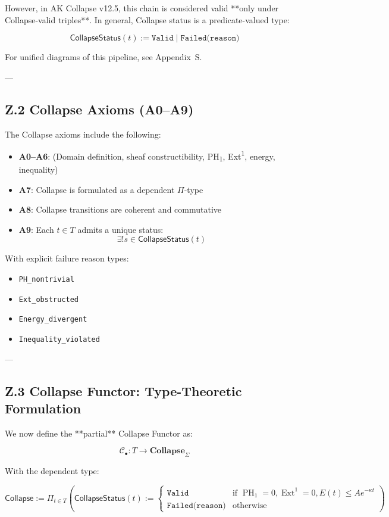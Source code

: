 \documentclass[11pt]{article}
\DeclareMathOperator{\Ext}{Ext}
\DeclareMathOperator{\PH}{PH}
\begin{document}
However, in AK Collapse v12.5, this chain is considered valid **only under Collapse-valid triples**.  
In general, Collapse status is a predicate-valued type:

\[
\mathsf{CollapseStatus}(t) := \texttt{Valid} \;|\; \texttt{Failed(reason)}
\]

For unified diagrams of this pipeline, see Appendix~S.

---

\subsection*{Z.2 Collapse Axioms (A0--A9)}

The Collapse axioms include the following:

\begin{itemize}
  \item \textbf{A0--A6}: (Domain definition, sheaf constructibility, PH\textsubscript{1}, Ext\textsuperscript{1}, energy, inequality)
  \item \textbf{A7}: Collapse is formulated as a dependent \( \Pi \)-type
  \item \textbf{A8}: Collapse transitions are coherent and commutative
  \item \textbf{A9}: Each \( t \in T \) admits a unique status:  
  \[
  \exists! s \in \mathsf{CollapseStatus}(t)
  \]
\end{itemize}

With explicit failure reason types:
\begin{itemize}
  \item[] \texttt{PH\_nontrivial}
  \item[] \texttt{Ext\_obstructed}
  \item[] \texttt{Energy\_divergent}
  \item[] \texttt{Inequality\_violated}
\end{itemize}

---

\subsection*{Z.3 Collapse Functor: Type-Theoretic Formulation}

We now define the **partial** Collapse Functor as:

\[
\mathcal{C}_\bullet : T \longrightarrow \mathbf{Collapse}_{\Sigma}
\]

With the dependent type:

\[
\mathsf{Collapse} := \Pi_{t \in T} \left(
  \mathsf{CollapseStatus}(t) := 
  \begin{cases}
    \texttt{Valid} & \text{if } \PH_1 = 0, \Ext^1 = 0, E(t) \leq Ae^{-\kappa t} \\
    \texttt{Failed(reason)} & \text{otherwise}
  \end{cases}
\right)
\]
\end{document}
